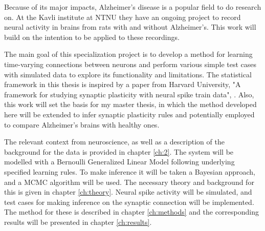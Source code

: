 Because of its major impacts, Alzheimer's disease is a popular field to do research on. At the Kavli institute at NTNU they have an ongoing project to record neural activity in brains from rats with and without Alzheimer’s. This work will build on the intention to be applied to these recordings.


The main goal of this specialization project is to develop a method for learning time-varying connections between neurons and perform various simple test cases with simulated data to explore its functionality and limitations. The statistical framework in this thesis is inspired by a paper from Harvard University, "A framework for studying synaptic plasticity with neural spike train data", \cite{Linderman}. Also, this work will set the basis for my master thesis, in which the method developed here will be extended to infer synaptic plasticity rules and potentially employed to compare Alzheimer's brains with healthy ones.

The relevant context from neuroscience, as well as a description of the background for the data is provided in chapter \ref{ch:2}. The system will be modelled with a Bernoulli Generalized Linear Model following underlying specified learning rules. To make inference it will be taken a Bayesian approach, and a MCMC algorithm will be used. The necessary theory and background for this is given in chapter \ref{ch:theory}. Neural spike activity will be simulated, and test cases for making inference on the synaptic connection will be implemented. The method for these is described in chapter \ref{ch:methods} and the corresponding results will be presented in chapter \ref{ch:results}.


